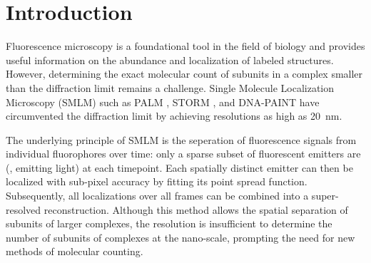 \section{Introduction}

%
Fluorescence microscopy is a foundational tool in the field of biology and
provides useful information on the abundance and localization of labeled
structures.
%
  However, determining the exact molecular count of subunits in a complex smaller than the diffraction limit
  remains a challenge. Single Molecule Localization Microscopy (SMLM) such as PALM
  \cite{betzig_imaging_2006}, STORM \cite{rust_sub-diffraction-limit_2006}, and
  DNA-PAINT \cite{schnitzbauer_super-resolution_2017} have circumvented the diffraction limit
  by achieving resolutions as high as \SI{20}{\nm}.

%
The underlying principle of SMLM is the
seperation of fluorescence signals from individual fluorophores over time:
%
  only a sparse subset of fluorescent emitters are 
  (\ie, emitting light) at each timepoint.
  Each spatially distinct emitter can then be localized with sub-pixel accuracy
  by fitting its point spread function. Subsequently, all localizations over
  all frames can be combined into a super-resolved reconstruction.
  Although this method allows the spatial separation of subunits of larger complexes, the resolution is insufficient to determine the number of subunits of complexes at the nano-scale, prompting the need for new methods of molecular
  counting.

